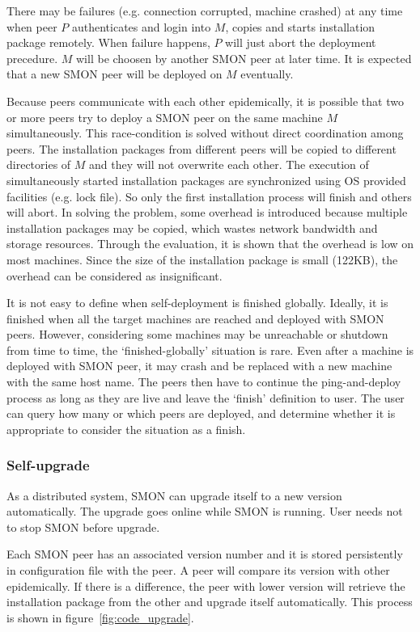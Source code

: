 There may be failures (e.g. connection corrupted, machine
crashed) at any time when peer $P$ authenticates and login
into $M$, copies and starts installation package remotely.
When failure happens, $P$ will just abort the deployment
precedure. $M$ will be choosen by another SMON peer at later
time. It is expected that a new SMON peer will be deployed
on $M$ eventually.

Because peers communicate with each other epidemically, it
is possible that two or more peers try to deploy a SMON peer
on the same machine $M$ simultaneously. This race-condition
is solved without direct coordination among peers. The
installation packages from different peers will be copied to
different directories of $M$ and they will not overwrite
each other. The execution of simultaneously started
installation packages are synchronized using OS provided
facilities (e.g. lock file). So only the first installation
process will finish and others will abort. In solving the
problem, some overhead is introduced because multiple
installation packages may be copied, which wastes network
bandwidth and storage resources. Through the evaluation, it
is shown that the overhead is low on most machines. Since
the size of the installation package is small (122KB), the
overhead can be considered as insignificant.

It is not easy to define when self-deployment is finished
globally. Ideally, it is finished when all the target
machines are reached and deployed with SMON peers.  However,
considering some machines may be unreachable or shutdown
from time to time, the `finished-globally' situation is
rare. Even after a machine is deployed with SMON peer, it
may crash and be replaced with a new machine with the same
host name. The peers then have to continue the
ping-and-deploy process as long as they are live and leave
the `finish' definition to user. The user can query how many
or which peers are deployed, and determine whether it is
appropriate to consider the situation as a finish.

\subsubsection*{Self-upgrade}

As a distributed system, SMON can upgrade itself to a new
version automatically. The upgrade goes online while SMON is
running. User needs not to stop SMON before upgrade.

Each SMON peer has an associated version number and it is
stored persistently in configuration file with the peer.  A
peer will compare its version with other epidemically. If
there is a difference, the peer with lower version will
retrieve the installation package from the other and upgrade
itself automatically. This process is shown in
figure~\ref{fig:code_upgrade}.

